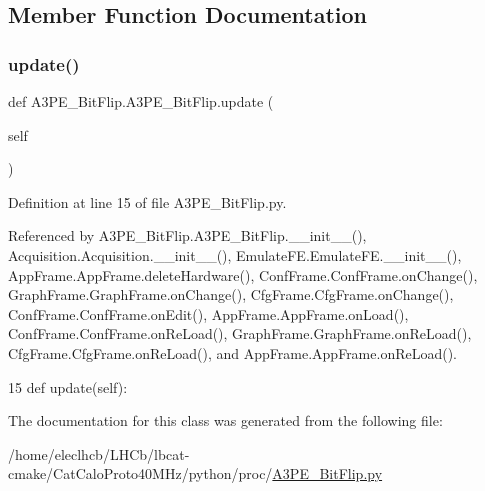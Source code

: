 \subsection{Member Function Documentation}
\mbox{\label{classA3PE__BitFlip_1_1A3PE__BitFlip_a6259691e444dd8ca8add74ddb359e4bc}} 
\subsubsection{\texorpdfstring{update()}{update()}}
{\footnotesize\ttfamily def A3\+P\+E\+\_\+\+Bit\+Flip.\+A3\+P\+E\+\_\+\+Bit\+Flip.\+update (\begin{DoxyParamCaption}\item[{}]{self }\end{DoxyParamCaption})}



Definition at line 15 of file A3\+P\+E\+\_\+\+Bit\+Flip.\+py.



Referenced by A3\+P\+E\+\_\+\+Bit\+Flip.\+A3\+P\+E\+\_\+\+Bit\+Flip.\+\_\+\+\_\+init\+\_\+\+\_\+(), Acquisition.\+Acquisition.\+\_\+\+\_\+init\+\_\+\+\_\+(), Emulate\+F\+E.\+Emulate\+F\+E.\+\_\+\+\_\+init\+\_\+\+\_\+(), App\+Frame.\+App\+Frame.\+delete\+Hardware(), Conf\+Frame.\+Conf\+Frame.\+on\+Change(), Graph\+Frame.\+Graph\+Frame.\+on\+Change(), Cfg\+Frame.\+Cfg\+Frame.\+on\+Change(), Conf\+Frame.\+Conf\+Frame.\+on\+Edit(), App\+Frame.\+App\+Frame.\+on\+Load(), Conf\+Frame.\+Conf\+Frame.\+on\+Re\+Load(), Graph\+Frame.\+Graph\+Frame.\+on\+Re\+Load(), Cfg\+Frame.\+Cfg\+Frame.\+on\+Re\+Load(), and App\+Frame.\+App\+Frame.\+on\+Re\+Load().


\begin{DoxyCode}
15     \textcolor{keyword}{def }update(self):
\end{DoxyCode}


The documentation for this class was generated from the following file\+:\begin{DoxyCompactItemize}
\item 
/home/eleclhcb/\+L\+H\+Cb/lbcat-\/cmake/\+Cat\+Calo\+Proto40\+M\+Hz/python/proc/\hyperlink{A3PE__BitFlip_8py}{A3\+P\+E\+\_\+\+Bit\+Flip.\+py}\end{DoxyCompactItemize}
